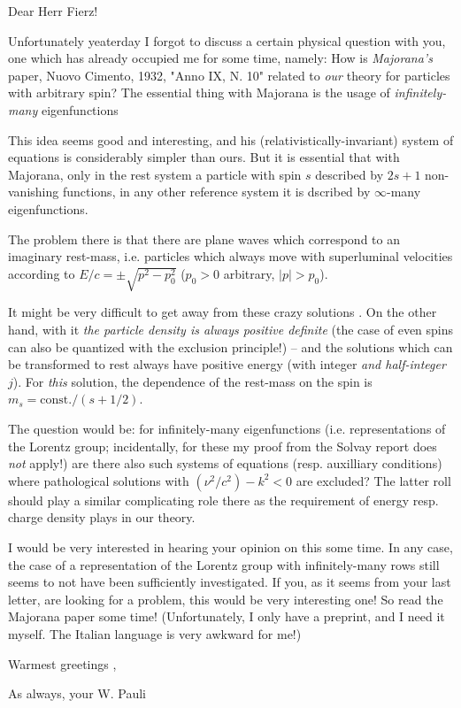 \date{July 3, 1940}

Dear Herr Fierz!

Unfortunately yeaterday I forgot to discuss a certain physical question with you, one which has already occupied me for some time, namely: How is \textit{Majorana's} paper, Nuovo Cimento, 1932, "Anno IX, N. 10" related to \textit{our} theory for particles with arbitrary spin? The essential thing with Majorana is the usage of \textit{infinitely-many} eigenfunctions

This idea seems good and interesting, and his (relativistically-invariant) system of equations is considerably simpler than ours. But it is essential that with Majorana, only in the rest system  a particle with spin $s$ described by $2s+1$ non-vanishing functions, in any other reference system it is dscribed by $\infty$-many eigenfunctions.

The problem there is that there are plane waves which correspond to an imaginary rest-mass, i.e. particles which always move with superluminal velocities according to $E/c = \pm \sqrt{p^2 - p_0^2}$ ($p_0>0$ arbitrary, $|p|>p_0$).

It might be very difficult to get away from these crazy solutions . On the other hand, with it \textit{the particle density is always positive definite} (the case of even spins can also be quantized with the exclusion principle!) -- and the solutions which can be transformed to rest always have positive energy (with integer \textit{and half-integer} $j$). For \textit{this} solution, the dependence of the rest-mass on the spin is $m_s = \text{const.}/(s+1/2)$.

The question would be: for infinitely-many eigenfunctions (i.e.  representations of the Lorentz group; incidentally, for these my proof from the Solvay report does \textit{not} apply!) are there also such systems of equations (resp. auxilliary conditions) where pathological solutions with $(\nu^2/c^2)-k^2<0$ are excluded? The latter roll should play a similar complicating role there as the requirement of energy resp. charge density plays in our theory.

I would be very interested in hearing your opinion on this some time. In any case, the case of a representation of the Lorentz group with infinitely-many rows still seems to not have been sufficiently investigated. If you, as it seems from your last letter, are looking for a problem, this would be very interesting one! So read the Majorana paper some time! (Unfortunately, I only have a preprint, and I need it myself. The Italian language is very awkward for me!)

Warmest greetings ,

As always, your W. Pauli

